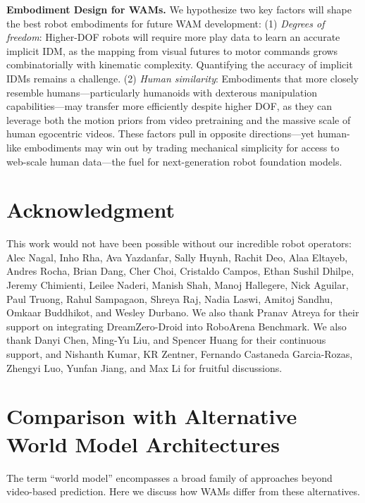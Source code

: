 \documentclass[10pt,logo,copyright]{nvidiatechreport}
\begin{document}
\textbf{Embodiment Design for WAMs.} We hypothesize two key factors will shape the best robot embodiments for future WAM development: (1) \textit{Degrees of freedom}: Higher-DOF robots will require more play data to learn an accurate implicit IDM, as the mapping from visual futures to motor commands grows combinatorially with kinematic complexity. Quantifying the accuracy of implicit IDMs remains a challenge. (2) \textit{Human similarity}: Embodiments that more closely resemble humans—particularly humanoids with dexterous manipulation capabilities—may transfer more efficiently despite higher DOF, as they can leverage both the motion priors from video pretraining and the massive scale of human egocentric videos. These factors pull in opposite directions—yet human-like embodiments may win out by trading mechanical simplicity for access to web-scale human data—the fuel for next-generation robot foundation models.

\section{Acknowledgment}
This work would not have been possible without our incredible robot operators: Alec Nagal, Inho Rha, Ava Yazdanfar, Sally Huynh, Rachit Deo, Alaa Eltayeb, Andres Rocha, Brian Dang, Cher Choi, Cristaldo Campos, Ethan Sushil Dhilpe, Jeremy Chimienti, Leilee Naderi, Manish Shah, Manoj Hallegere, Nick Aguilar, Paul Truong, Rahul Sampagaon, Shreya Raj, Nadia Laswi, Amitoj Sandhu, Omkaar Buddhikot, and Wesley Durbano. We also thank Pranav Atreya for their support on integrating DreamZero-Droid into RoboArena Benchmark. We also thank Danyi Chen, Ming-Yu Liu, and Spencer Huang for their continuous support, and Nishanth Kumar, KR Zentner, Fernando Castaneda Garcia-Rozas, Zhengyi Luo, Yunfan Jiang, and Max Li for fruitful discussions.

\clearpage
\appendix
\section{Comparison with Alternative World Model Architectures}
\label{appen:world_model_comparison}

The term ``world model'' encompasses a broad family of approaches beyond video-based prediction. Here we discuss how WAMs differ from these alternatives.
\end{document}
